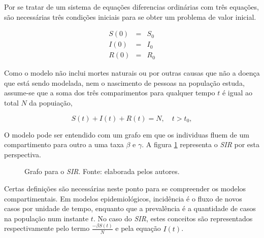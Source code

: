 Por se tratar de um sistema de equações diferencias ordinárias com três equações,
são necessárias três condições iniciais para se obter um problema de valor
inicial.

\begin{eqnarray}
   S(0) &=& S_0 \label{eq:SIR-S0}\\
   I(0) &=& I_0 \label{eq:SIR-I0}\\
   R(0) &=& R_0 \label{eq:SIR-R0}
\end{eqnarray}

Como o modelo não inclui mortes naturais ou por outras causas que não a doença
que está sendo modelada, nem o nascimento de pessoas na população estuda, assume-se
que a soma dos três comparimentos para qualquer tempo $t$ é igual ao total 
$N$ da popuiação,

\begin{equation}
   S(t) + I(t) + R(t) = N,  \quad t > t_0, \label{eq:SIR-4}
\end{equation}

O modelo pode ser entendido com um grafo em que os individuas fluem de um 
compartimento para outro a uma taxa $\beta$ e $\gamma$. 
A figura \ref{fig:sir-grafo} representa o \textit{SIR} por esta perspectiva.

\begin{figure}[H]
\centering
{}
\caption{Grafo para o \textit{SIR}. Fonte: elaborada pelos autores.}
\label{fig:sir-grafo}
\end{figure}

Certas definições são necessárias neste ponto para se compreender os modelos compartimentais. 
Em modelos epidemiológicos, incidência é o fluxo de novos casos por unidade de tempo,
enquanto que a prevalência é a quantidade de casos na população num instante $t$.
No caso do \textit{SIR}, estes conceitos são representados respectivamente pelo
termo $\frac{-\beta S(t)}{N}$ e pela equação $I(t)$. 


